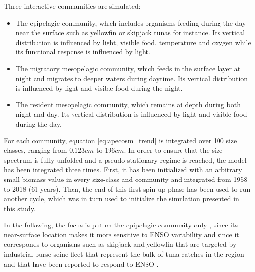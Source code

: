 %
%

Three interactive communities are simulated:
\begin{itemize}
\item{The epipelagic community, which includes organisms feeding during the day near the surface such as yellowfin or skipjack tunas for instance. Its vertical distribution is influenced by light, visible food, temperature and oxygen while its functional response is influenced by light.}
\item{The migratory mesopelagic community, which feeds in the surface layer at night and migrates to deeper waters during daytime. Its vertical distribution is influenced by light and visible food during the night.}
\item{The resident mesopelagic community, which remains at depth during both night and day. Its vertical distribution is influenced by light and visible food during the day.}
\end{itemize}

For each community, equation \ref{eq:apecosm_trend} is integrated over 100 size classes, ranging from $0.123cm$ to $196cm$. In order to ensure that the size-spectrum is fully unfolded and a pseudo stationary regime is reached, the model has been integrated three times. First, it has been initialized with an arbitrary small biomass value in every size-class and community and integrated from 1958 to 2018 (61 years). Then, the end of this first spin-up phase has been used to run another cycle, which was in turn used to initialize the simulation presented in this study.


In the following, the focus is put on the epipelagic community only , since its near-surface location makes it more sensitive to ENSO variability \citep{lemezoNaturalVariabilityMarine2016} and since it corresponds to organisms such as skipjack and yellowfin that are targeted by industrial purse seine fleet that represent the bulk of tuna catches in the region and that have been reported to respond to ENSO \citep{lehodeyNinoSouthernOscillation1997}.
